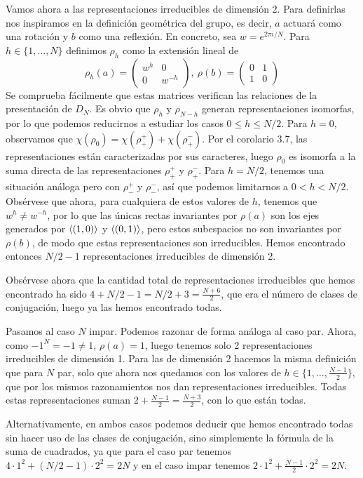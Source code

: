 \documentclass[twoside]{article}
\begin{document}
\begin{solucion}
\begin{enumerate}[(a)]
Vamos ahora a las representaciones irreducibles de dimensión 2. Para definirlas nos inspiramos en la definición geométrica del grupo, es decir, $a$ actuará como una rotación y $b$ como una reflexión. En concreto, sea $w=e^{2\pi i/N}$. Para $h\in\{1,\dots, N\}$ definimos $\rho_h$ como la extensión lineal de
\[
\rho_h(a)=\begin{pmatrix}
w^h & 0\\
0 & w^{-h}
\end{pmatrix},\ \rho(b)=\begin{pmatrix}
0 & 1\\
1 & 0
\end{pmatrix}
\]
Se comprueba fácilmente que estas matrices verifican las relaciones de la presentación de $D_N$. Es obvio que $\rho_h$ y $\rho_{N-h}$ generan representaciones isomorfas, por lo que podemos reducirnos a estudiar los casos $0\leq h\leq N/2$. Para $h=0$, observamos que $\chi(\rho_0)=\chi(\rho_+^+)+\chi(\rho_+^-)$. Por el corolario 3.7, las representaciones están caracterizadas por sus caracteres, luego $\rho_0$ es isomorfa a la suma directa de las representaciones $\rho_+^+$ y $\rho_+^-$. Para $h=N/2$, tenemos una situación análoga pero con $\rho_-^+$ y $\rho_-^-$, así que podemos limitarnos a $0<h<N/2$. Obsérvese que ahora, para cualquiera de estos valores de $h$, tenemos que $w^h\neq w^{-h}$, por lo que las únicas rectas invariantes por $\rho(a)$ son los ejes generados por $\langle{(1,0)}\rangle$ y $\langle{(0,1)}\rangle$, pero estos subespacios no son invariantes por $\rho(b)$, de modo que estas representaciones son irreducibles. Hemos encontrado entonces $N/2-1$ representaciones irreducibles de dimensión 2.

Obsérvese ahora que la cantidad total de representaciones irreducibles que hemos encontrado ha sido $4+N/2-1=N/2+3=\frac{N+6}{2}$, que era el número de clases de conjugación, luego ya las hemos encontrado todas. 




Pasamos al caso $N$ impar. Podemos razonar de forma análoga al caso par. Ahora, como $-1^N=-1\neq 1$, $\rho(a)=1$, luego tenemos solo 2 representaciones irreducibles de dimensión 1. Para las de dimensión 2 hacemos la misma definición que para $N$ par, solo que ahora nos quedamos con los valores de $h\in\{1,\dots, \frac{N-1}{2}\}$, que por los mismos razonamientos nos dan representaciones irreducibles. Todas estas representaciones suman $2+\frac{N-1}{2}=\frac{N+3}{2}$, con lo que están todas.


Alternativamente, en ambos casos podemos deducir que hemos encontrado todas sin hacer uso de las clases de conjugación, sino simplemente la fórmula de la suma de cuadrados, ya que para el caso par tenemos $4\cdot 1^2+(N/2-1)\cdot 2^2=2N$ y en el caso impar tenemos $2\cdot 1^2+\frac{N-1}{2}\cdot 2^2=2N$. 



\end{enumerate}
\end{solucion}
\end{document}
